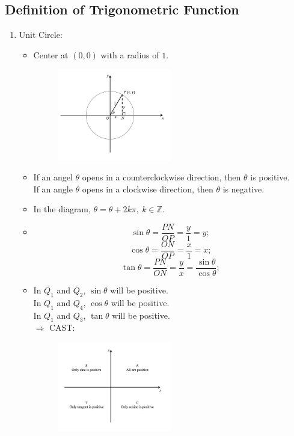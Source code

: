 \documentclass[12pt, a4paper]{article}
\def\Z{{\mathbb{Z}}}
\begin{document}
\subsection{Definition of Trigonometric Function}
\begin{enumerate}
  \item Unit Circle: 
  \begin{itemize}
    \item Center at $(0,0)$ with a radius of $1$.
    \begin{figure}[H]
      \centering
      \includegraphics[width=0.5\textwidth]{Fig.22.jpg}
    \end{figure}
    \item If an angel $\theta$ opens in a counterclockwise direction, then $\theta$ is positive. \\
    If an angle $\theta$ opens in a clockwise direction, then $\theta$ is negative. 
    \item In the diagram, $\theta=\theta+2k\pi,\ k\in\Z.$
    \item $$\sin\theta=\frac{PN}{OP}=\frac{y}{1}=y; $$
    $$\cos\theta=\frac{ON}{OP}=\frac{x}{1}=x; $$
    $$\tan\theta=\frac{PN}{ON}=\frac{y}{x}=\frac{\sin\theta}{\cos\theta}; $$
    \item In $Q_1$ and $Q_2$, $\sin\theta$ will be positive.\\
    In $Q_1$ and $Q_4$, $\cos\theta$ will be positive.\\
    In $Q_1$ and $Q_3$, $\tan\theta$ will be positive.\\
    $\Rightarrow$ CAST: 
    \begin{figure}[H]
      \centering
      \includegraphics[width=0.5\textwidth]{Fig.23.jpg}

\end{figure}
\end{itemize}
\end{enumerate}
\end{document}
